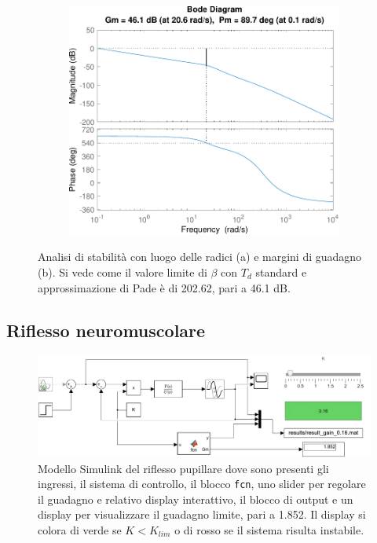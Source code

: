 \begin{figure}[t!]
	\begin{subfigure}{0.5\linewidth}
		\centering
		\includegraphics[width=0.85\linewidth]{../code/stretch/figs/margin}
		\caption{}
		\label{fig:margin_stretch}
	\end{subfigure}\hfill
	\caption{Analisi di stabilità con luogo delle radici (a) e margini di guadagno (b). Si vede come il valore limite di $\beta$ con $T_d$ standard e approssimazione di Pade è di 202.62, pari a 46.1 dB.}
	\end{figure}

\subsection{Riflesso neuromuscolare}

\begin{figure}[t!]
	\centering
	\includegraphics[width=0.8\linewidth]{figures/simulink_pupillary}
	\caption{Modello Simulink del riflesso pupillare dove sono presenti gli ingressi, il sistema di controllo, il blocco \texttt{fcn}, uno slider per regolare il guadagno e relativo display interattivo, il blocco di output e un display per visualizzare il guadagno limite, pari a 1.852. Il display si colora di verde se $K<K_{lim}$ o di rosso se il sistema risulta instabile.}
	\label{fig:simulinkpupillary}
\end{figure}

